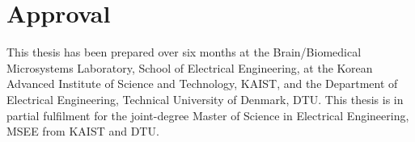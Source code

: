 \thispagestyle{main}
\setcounter{page}{1}
\chapter*{Approval}
This thesis has been prepared over six months at the Brain/Biomedical Microsystems Laboratory, School of Electrical Engineering, at the Korean Advanced Institute of Science and Technology, KAIST, and the Department of Electrical Engineering, Technical University of Denmark, DTU. This thesis is in partial fulfilment for the joint-degree Master of Science in Electrical Engineering, MSEE from KAIST and DTU.

\vfill

\begin{center}
\namesigdate{\thesisauthor~-~\studentnumber}
\end{center}

\vfill

